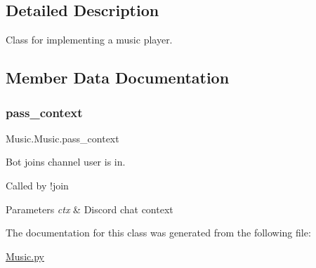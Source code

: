 \subsection{Detailed Description}
Class for implementing a music player. 

\subsection{Member Data Documentation}
\mbox{\label{class_music_1_1_music_ab45fab6c44555d0360d31516d69c20d2}} 
\subsubsection{\texorpdfstring{pass\+\_\+context}{pass\_context}}
{\footnotesize\ttfamily Music.\+Music.\+pass\+\_\+context\hspace{0.3cm}{\ttfamily [static]}}



Bot joins channel user is in. 

Called by !join 
\begin{DoxyParams}{Parameters}
{\em ctx} & Discord chat context \\
\hline
\end{DoxyParams}


The documentation for this class was generated from the following file\+:\begin{DoxyCompactItemize}
\item 
\mbox{\hyperlink{_music_8py}{Music.\+py}}\end{DoxyCompactItemize}
